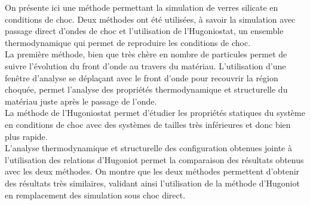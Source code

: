 \documentclass[aps,10pt,twocolumn]{revtex4}
\begin{document}
On pr\'esente ici une m\'ethode permettant la simulation de verres silicate en conditions de
choc. Deux m\'ethodes ont \'et\'e utilis\'ees, \`a savoir la simulation avec passage direct
d'ondes de choc et l'utilisation de l'Hugoniostat, un ensemble thermodynamique qui permet de
reproduire les conditions de choc.\\
La premi\`ere m\'ethode, bien que tr\`es ch\`ere en nombre de particules permet de suivre
l'\'evolution du front d'onde au travers du mat\'eriau. L'utilisation d'une fen\^etre
d'analyse se d\'epla\c{c}ant avec le front d'onde pour recouvrir la r\'egion choqu\'ee, permet
l'analyse des propri\'et\'es thermodynamique et structurelle du mat\'eriau juste apr\`es le
passage de l'onde.\\
La m\'ethode de l'Hugoniostat permet d'\'etudier les propri\'et\'es statiques du syst\`eme en
conditions de choc avec des syst\`emes de tailles tr\`es inf\'erieures et donc bien plus
rapide.\\
L'analyse thermodynamique et structurelle des configuration obtenues jointe \`a l'utilisation
des relations d'Hugoniot permet la comparaison des r\'esultats obtenus avec les deux
m\'ethodes. On montre que les deux m\'ethodes permettent d'obtenir des r\'esultats tr\`es
similaires, validant ainsi l'utilisation de la m\'ethode d'Hugoniot en remplacement des
simulation sous choc direct.



\end{document}
